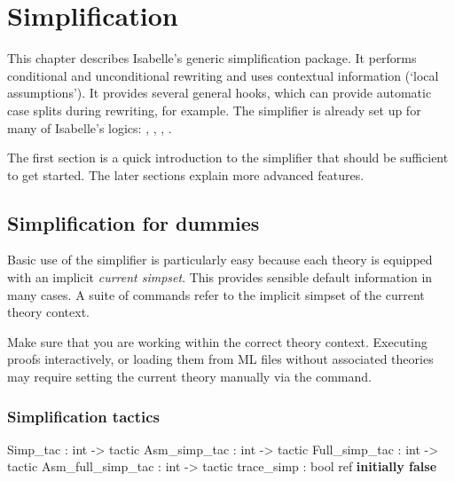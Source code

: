 \chapter{Simplification}
\label{chap:simplification}

This chapter describes Isabelle's generic simplification package.  It
performs conditional and unconditional rewriting and uses contextual
information (`local assumptions').  It provides several general hooks,
which can provide automatic case splits during rewriting, for example.
The simplifier is already set up for many of Isabelle's logics: \FOL,
\ZF, \HOL, \HOLCF.

The first section is a quick introduction to the simplifier that
should be sufficient to get started.  The later sections explain more
advanced features.


\section{Simplification for dummies}
\label{sec:simp-for-dummies}

Basic use of the simplifier is particularly easy because each theory
is equipped with an implicit {\em current
  simpset}.  This provides sensible default
information in many cases.  A suite of commands refer to the implicit
simpset of the current theory context.

\begin{warn}
  Make sure that you are working within the correct theory context.
  Executing proofs interactively, or loading them from ML files
  without associated theories may require setting the current theory
  manually via the  command.
\end{warn}

\subsection{Simplification tactics} \label{sec:simp-for-dummies-tacs}
\begin{ttbox}
Simp_tac          : int -> tactic
Asm_simp_tac      : int -> tactic
Full_simp_tac     : int -> tactic
Asm_full_simp_tac : int -> tactic
trace_simp        : bool ref \hfill{\bf initially false}
\end{ttbox}


